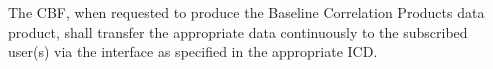 The CBF, when requested to produce the Baseline Correlation Products
data product, shall transfer the appropriate data continuously to the
subscribed user(s) via the interface as specified in the appropriate
ICD.
